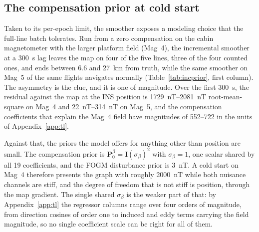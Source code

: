 \documentclass{IEEEtaes}
\begin{document}
\subsection{The compensation prior at cold start}\label{sec:coldprior}
Taken to its per-epoch limit, the smoother exposes a modeling choice that the
full-line batch tolerates. Run from a zero compensation on the cabin
magnetometer with the larger platform field (Mag~4), the incremental smoother at
a \SI{300}{\second} lag leaves the map on four of the five lines, three of the
four counted ones, and ends between \num{6.6} and \SI{27}{\kilo\meter} from
truth, while the same smoother on Mag~5 of the same flights navigates normally
(Table~\ref{tab:incprior}, first column). The asymmetry is the clue, and it is
one of magnitude. Over the first \SI{300}{\second}, the residual against the map
at the INS position is \SIrange{1729}{2081}{\nano\tesla} root-mean-square on
Mag~4 and \SIrange{22}{314}{\nano\tesla} on Mag~5, and the compensation
coefficients that explain the Mag~4 field have magnitudes of
\numrange{552}{722} in the units of Appendix~\ref{app:tl}.

Against that, the priors the model offers for anything other than position are
small. The compensation prior is $\mathbf{P}_0^{\beta}=\mathbf{I}(\sigma_{\beta})^2$
with $\sigma_{\beta}=1$, one scalar shared by all \num{19} coefficients, and the
FOGM disturbance prior is \SI{3}{\nano\tesla}. A cold start on Mag~4 therefore
presents the graph with roughly \SI{2000}{\nano\tesla} while both nuisance
channels are stiff, and the degree of freedom that is not stiff is position,
through the map gradient. The single shared
$\sigma_{\beta}$ is the weaker part of that: by Appendix~\ref{app:tl} the
regressor columns range over four orders of magnitude, from direction cosines of
order one to induced and eddy terms carrying the field magnitude, so no single
coefficient scale can be right for all of them.
\end{document}
